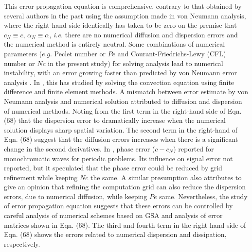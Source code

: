\documentclass[showpacs,preprintnumbers,amsmath,amssymb]{revtex4-1} %
\begin{document}
This error propagation equation is comprehensive, contrary to that obtained by several authors in the past using the assumption made in von Neumann analysis, where the right-hand side identically has taken to be zero on the premise that $c_N\equiv c$, $\alpha_N\equiv \alpha$, \textit{i.e.} there are no numerical diffusion and dispersion errors and the numerical method is entirely neutral. Some combinations of numerical parameters ($\textit{e.g.}$ Peclet number or $Pe$ and Courant-Friedrichs-Lewy (CFL) number \cite{NEUMANN_at_al} or $Nc$ in the present study) for solving analysis lead to numerical instability, with an error growing faster than predicted by von Neumann error analysis \cite{SENGUPTA_et_al_2}. In \cite{Vichnevetsky_et_al}, this has studied by solving the convection equation using finite difference and finite element methods. A mismatch between error estimate by von Neumann analysis and numerical solution attributed to diffusion and dispersion of numerical methods. Noting from the first term in the right-hand side of Eqn. (68) that the dispersion error to dramatically increase when the numerical solution displays sharp spatial variation. The second term in the right-hand of Eqn. (68) suggest that the diffusion errors increases when there is a significant change in the second derivatives. In \cite{KREISS1972, Swartz1974, Trefethen_et_al}, phase error ($c-c_N$) reported for monochromatic waves for periodic problems. Its influence on signal error not reported, but it speculated that the phase error could be reduced by grid refinement while keeping $Nc$ the same. A similar presumption also attributes to give an opinion that refining the computation grid can also reduce the dispersion errors, due to numerical diffusion, while keeping $Pe$ same. Nevertheless, the study of error propagation equation suggests that these errors can be controlled by careful analysis of numerical schemes based on GSA and analysis of error matrices shown in Eqn. (68). The third and fourth term in the right-hand side of Eqn. (68) shows the errors related to numerical dispersion and dissipation, respectively.
\end{document}

